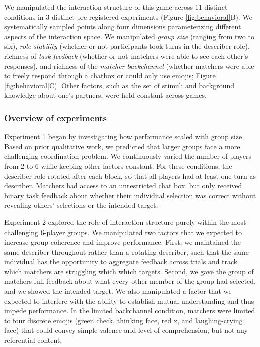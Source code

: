\documentclass[
  english,
]{article}
\begin{document}
We manipulated the interaction structure of this game across 11 distinct conditions in 3 distinct pre-registered experiments (Figure \ref{fig:behavioral}B).
We systematically sampled points along four dimensions parameterizing different aspects of the interaction space.
We manipulated \emph{group size} (ranging from two to six), \emph{role stability} (whether or not participants took turns in the describer role), richness of \emph{task feedback} (whether or not matchers were able to see each other's responses), and richness of the \emph{matcher backchannel} (whether matchers were able to freely respond through a chatbox or could only use emojis; Figure \ref{fig:behavioral}C).
Other factors, such as the set of stimuli and background knowledge about one's partners, were held constant across games.

\hypertarget{overview-of-experiments}{%
\subsubsection{Overview of experiments}\label{overview-of-experiments}}

Experiment 1 began by investigating how performance scaled with group size.
Based on prior qualitative work, we predicted that larger groups face a more challenging coordination problem.
We continuously varied the number of players from 2 to 6 while keeping other factors constant.
For these conditions, the describer role rotated after each block, so that all players had at least one turn as describer.
Matchers had access to an unrestricted chat box, but only received binary task feedback about whether their individual selection was correct without revealing others' selections or the intended target.

Experiment 2 explored the role of interaction structure purely within the most challenging 6-player groups.
We manipulated two factors that we expected to increase group coherence and improve performance.
First, we maintained the same describer throughout rather than a rotating describer, such that the same individual has the opportunity to aggregate feedback across trials and track which matchers are struggling which which targets.
Second, we gave the group of matchers full feedback about what every other member of the group had selected, and we showed the intended target.
We also manipulated a factor that we expected to interfere with the ability to establish mutual understanding and thus impede performance.
In the limited backchannel condition, matchers were limited to four discrete emojis (green check, thinking face, red x, and laughing-crying face) that could convey simple valence and level of comprehension, but not any referential content.
\end{document}
